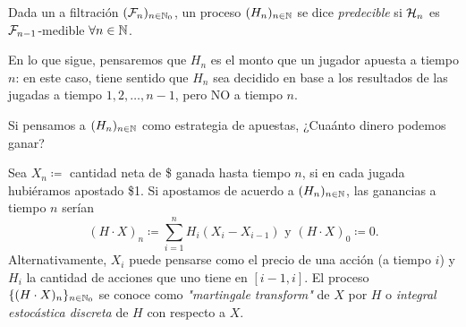 \begin{definition}
	Dada un a filtración $(\mathcal{F}_{n})_{n \in \mathbb{N}_{0}}$, un proceso $(H_{n})_{n \in \mathbb{N}}$ se dice \textit{predecible} si $\mathcal{H}_{n}$ es $\mathcal{F}_{n-1}$-medible $\forall n \in \mathbb{N}$.
\end{definition}
\medskip
En lo que sigue, pensaremos que $H_{n}$ es el monto que un jugador apuesta a tiempo $n$: en este caso, tiene sentido que $H_{n}$ sea decidido en base a los resultados de las jugadas a tiempo $1, 2, \dots, n-1$, pero NO a tiempo $n$.

\begin{pregunta}
	Si pensamos a $(H_{n})_{n \in \mathbb{N}}$ como estrategia de apuestas, ¿Cuaánto dinero podemos ganar?
\end{pregunta}

Sea $X_{n} \coloneq$ cantidad neta de \$ ganada hasta tiempo $n$, si en cada jugada hubiéramos apostado \$1. Si apostamos de acuerdo a $(H_{n})_{n \in \mathbb{N}}$, las ganancias a tiempo $n$ serían
\[ (H \cdot X)_{n} \coloneq \sum_{i=1}^{n} H_{i} (X_{i} - X_{i-1}) \text{ y } (H \cdot X)_{0} \coloneq 0. \]
Alternativamente, $X_{i}$ puede pensarse como el precio de una acción (a tiempo $i$) y $H_{i}$ la cantidad de acciones que uno tiene en $[i-1, i]$. El proceso $\{(H \cdot X)_{n}\}_{n \in \mathbb{N}_{0}}$ se conoce como \textit{"martingale transform"} de $X$ por $H$ o \textit{integral estocástica discreta} de $H$ con respecto a $X$.
